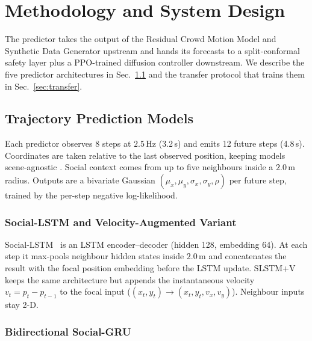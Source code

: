 \documentclass[conference]{IEEEtran}
\begin{document}
\section{Methodology and System Design}

The predictor takes the output of the Residual Crowd Motion Model and
Synthetic Data Generator upstream and hands its forecasts to a
split-conformal safety layer plus a PPO-trained diffusion controller
downstream.  We describe the five predictor architectures in
Sec.~\ref{sec:tpm} and the transfer protocol that trains them in
Sec.~\ref{sec:transfer}.


\subsection{Trajectory Prediction Models}
\label{sec:tpm}

Each predictor observes 8 steps at $2.5$\,Hz (3.2\,s) and emits 12
future steps (4.8\,s).  Coordinates are taken relative to the last
observed position, keeping models scene-agnostic
\cite{alahi2016social}.  Social context comes from up to five
neighbours inside a $2.0$\,m radius.  Outputs are a bivariate Gaussian
$(\mu_x, \mu_y, \sigma_x, \sigma_y, \rho)$ per future step, trained by
the per-step negative log-likelihood.

\subsubsection{Social-LSTM and Velocity-Augmented Variant}

Social-LSTM~\cite{alahi2016social} is an LSTM encoder--decoder
(hidden 128, embedding 64).  At each step it max-pools neighbour hidden
states inside $2.0$\,m and concatenates the result with the focal
position embedding before the LSTM update.  SLSTM+V keeps the same
architecture but appends the instantaneous velocity
$v_t = p_t - p_{t-1}$ to the focal input
($(x_t,y_t)\!\to\!(x_t,y_t,v_x,v_y)$).  Neighbour inputs stay 2-D.

\subsubsection{Bidirectional Social-GRU}
\end{document}
